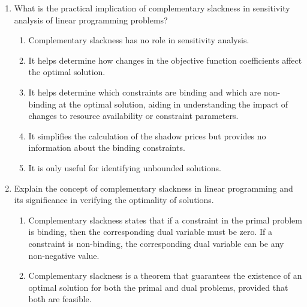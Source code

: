 \documentclass{article}%
\begin{document}
\begin{enumerate}
\begin{enumerate}%
\item Complementary slackness is irrelevant for verifying the dual solution's optimality.%
\item Check if the primal objective function value equals the dual objective function value.%
\item Verify that the complementary slackness conditions are satisfied for both the primal and dual solutions.%
\item Solve the dual problem independently and compare the objective function values.%
\item There is no way to verify the dual solution's optimality using only the primal solution.%
\end{enumerate}%
\vspace{1em}%
\item What is the practical implication of complementary slackness in sensitivity analysis of linear programming problems?%
\begin{enumerate}%
\item Complementary slackness has no role in sensitivity analysis.%
\item It helps determine how changes in the objective function coefficients affect the optimal solution.%
\item It helps determine which constraints are binding and which are non-binding at the optimal solution, aiding in understanding the impact of changes to resource availability or constraint parameters.%
\item It simplifies the calculation of the shadow prices but provides no information about the binding constraints.%
\item It is only useful for identifying unbounded solutions.%
\end{enumerate}%
\vspace{1em}%
\item Explain the concept of complementary slackness in linear programming and its significance in verifying the optimality of solutions.%
\begin{enumerate}%
\item Complementary slackness states that if a constraint in the primal problem is binding, then the corresponding dual variable must be zero.  If a constraint is non-binding, the corresponding dual variable can be any non-negative value.%
\item Complementary slackness is a theorem that guarantees the existence of an optimal solution for both the primal and dual problems, provided that both are feasible.%

\end{enumerate}
\end{enumerate}
\end{document}
